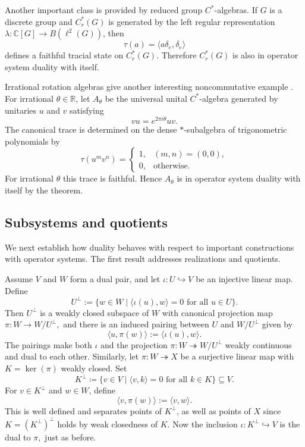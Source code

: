 \documentclass[11pt,onecolumn]{article}
\theoremstyle{plain}
\theoremstyle{definition}
\begin{document}
Another important class is provided by reduced group $C^*$-algebras.  If
$G$ is a discrete group and $C^*_r(G)$ is generated by the left regular
representation $\lambda\colon \mathbb C[G]\to B(\ell^2(G))$, then
\[
    \tau(a)=\langle a\delta_e,\delta_e\rangle
\]
defines a faithful tracial state on $C^*_r(G)$. Therefore
$C^*_r(G)$ is also in operator system duality with itself.

Irrational rotation algebras give another interesting noncommutative example \cite{Davidson1996}. For
irrational $\theta\in\mathbb R$, let $A_\theta$ be the universal unital
$C^*$-algebra generated by unitaries $u$ and $v$ satisfying
\[
    vu=e^{2\pi i\theta}uv.
\]
The canonical trace is determined on the dense $*$-subalgebra of trigonometric
polynomials by
\[
    \tau(u^m v^n)=
    \begin{cases}
        1, & (m,n)=(0,0),\\
        0, & \text{otherwise}.
    \end{cases}
\]
For irrational $\theta$ this trace is faithful.  Hence $A_\theta$ is in
operator system duality with itself by the theorem.

\subsection{Subsystems and quotients}

We next establish how duality behaves with respect to important constructions with operator systems. The first result addresses realizations and quotients.

Assume  $V$ and $W$ form a dual pair, and let
$\iota\colon U\hookrightarrow V$ be an injective linear map.  Define
\[
    U^\perp:=\{w\in W\mid \langle\iota(u),w\rangle=0
    \text{ for all }u\in U\}.
\]
Then $U^\perp$ is a weakly closed subspace of $W$ with canonical projection map $\pi\colon W\to W/U^\perp,$ and there is an induced pairing between
$U$ and $W/U^\perp$ given by
\[
    \langle u,\pi(w)\rangle:=\langle\iota(u),w\rangle.
\]
The pairings make both $\iota$ and the projection
$\pi\colon W\twoheadrightarrow W/U^\perp$ weakly continuous and dual to each other.
Similarly, let $\pi\colon W\twoheadrightarrow X$ be a surjective
linear map with $K=\ker(\pi)$ weakly closed. Set
\[
    K^\perp\coloneqq\{v\in V\mid \langle v,k\rangle=0
    \text{ for all }k\in K\}\subseteq V.
\]
For $v\in K^\perp$ and $w\in W$, define
\[
    \langle v,\pi(w)\rangle:=\langle v,w\rangle.
\]
This is well defined and  separates
points of $K^\perp$, as well as points of $X$ since \( K=(K^\perp)^\perp\) holds by weak closedness of $K$. Now the inclusion $\iota\colon K^\perp\hookrightarrow V$ is the dual to $\pi,$ just as before.
\end{document}
